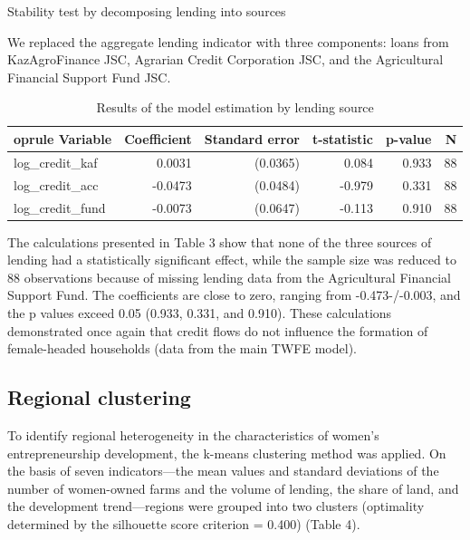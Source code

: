 ﻿\documentclass[pdflatex,sn-mathphys-ay]{sn-jnl}
\begin{document}
Stability test by decomposing lending into sources

We replaced the aggregate lending indicator with three components: loans
from KazAgroFinance JSC, Agrarian Credit Corporation JSC, and the
Agricultural Financial Support Fund JSC.

\begin{table}[htbp]
\caption{Results of the model estimation by lending source}\label{tab:lending-source}%
\small
\begin{tabular*}{\textwidth}{@{\extracolsep{\fill}}p{}rrrrr@{}}
	oprule
Variable & Coefficient & Standard error & t-statistic & p-value & N\\
\midrule
log\_credit\_kaf & 0.0031 & (0.0365) & 0.084 & 0.933 & 88\\
log\_credit\_acc & -0.0473 & (0.0484) & -0.979 & 0.331 & 88\\
log\_credit\_fund & -0.0073 & (0.0647) & -0.113 & 0.910 & 88\\
\bottomrule
\end{tabular*}
\end{table}

The calculations presented in Table 3 show that none of the three
sources of lending had a statistically significant effect, while the
sample size was reduced to 88 observations because of missing lending
data from the Agricultural Financial Support Fund. The coefficients are
close to zero, ranging from -0.473-/-0.003, and the p values exceed
0.05 (0.933, 0.331, and 0.910). These calculations demonstrated once
again that credit flows do not influence the formation of female-headed
households (data from the main TWFE model).

\subsection{Regional clustering}

To identify regional heterogeneity in the characteristics of women's
entrepreneurship development, the k-means clustering method was applied.
On the basis of seven indicators---the mean values and standard
deviations of the number of women-owned farms and the volume of lending,
the share of land, and the development trend---regions were grouped into
two clusters (optimality determined by the silhouette score criterion =
0.400) (Table 4).
\end{document}
